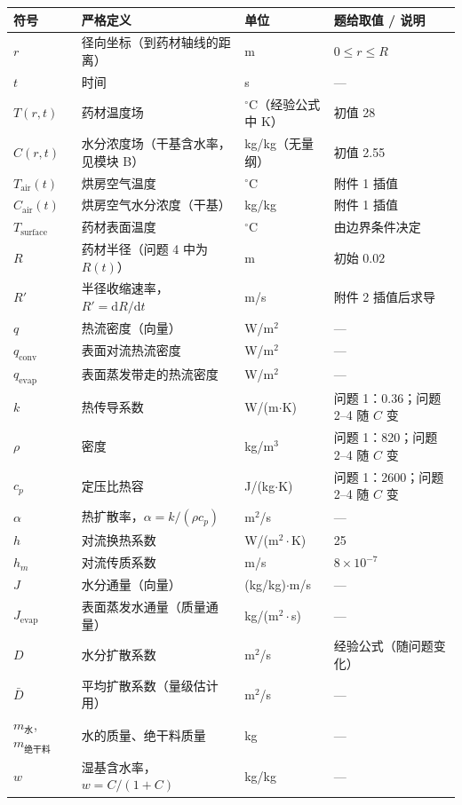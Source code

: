 \documentclass[12pt,a4paper]{ctexart}
\begin{document}
\begin{center}
\small
\begin{tabular}{llll}
\toprule
符号 & 严格定义 & 单位 & 题给取值 / 说明 \\
\midrule
$r$ & 径向坐标（到药材轴线的距离） & m & $0\le r\le R$ \\
$t$ & 时间 & s & --- \\
$T(r,t)$ & 药材温度场 & $^\circ$C（经验公式中 K） & 初值 28 \\
$C(r,t)$ & 水分浓度场（干基含水率，见模块 B） & kg/kg（无量纲） & 初值 2.55 \\
$T_{\mathrm{air}}(t)$ & 烘房空气温度 & $^\circ$C & 附件 1 插值 \\
$C_{\mathrm{air}}(t)$ & 烘房空气水分浓度（干基） & kg/kg & 附件 1 插值 \\
$T_{\mathrm{surface}}$ & 药材表面温度 & $^\circ$C & 由边界条件决定 \\
$R$ & 药材半径（问题 4 中为 $R(t)$） & m & 初始 $0.02$ \\
$R'$ & 半径收缩速率，$R'=\mathrm{d}R/\mathrm{d}t$ & m/s & 附件 2 插值后求导 \\
$q$ & 热流密度（向量） & W/m$^2$ & --- \\
$q_{\mathrm{conv}}$ & 表面对流热流密度 & W/m$^2$ & --- \\
$q_{\mathrm{evap}}$ & 表面蒸发带走的热流密度 & W/m$^2$ & --- \\
$k$ & 热传导系数 & W/(m$\cdot$K) & 问题 1：0.36；问题 2--4 随 $C$ 变 \\
$\rho$ & 密度 & kg/m$^3$ & 问题 1：820；问题 2--4 随 $C$ 变 \\
$c_p$ & 定压比热容 & J/(kg$\cdot$K) & 问题 1：2600；问题 2--4 随 $C$ 变 \\
$\alpha$ & 热扩散率，$\alpha=k/(\rho c_p)$ & m$^2$/s & --- \\
$h$ & 对流换热系数 & W/(m$^2\cdot$K) & 25 \\
$h_m$ & 对流传质系数 & m/s & $8\times10^{-7}$ \\
$J$ & 水分通量（向量） & (kg/kg)$\cdot$m/s & --- \\
$J_{\mathrm{evap}}$ & 表面蒸发水通量（质量通量） & kg/(m$^2\cdot$s) & --- \\
$D$ & 水分扩散系数 & m$^2$/s & 经验公式（随问题变化） \\
$\bar D$ & 平均扩散系数（量级估计用） & m$^2$/s & --- \\
$m_{\text{水}}$, $m_{\text{绝干料}}$ & 水的质量、绝干料质量 & kg & --- \\
$w$ & 湿基含水率，$w=C/(1+C)$ & kg/kg & --- \\

\end{tabular}
\end{center}
\end{document}
